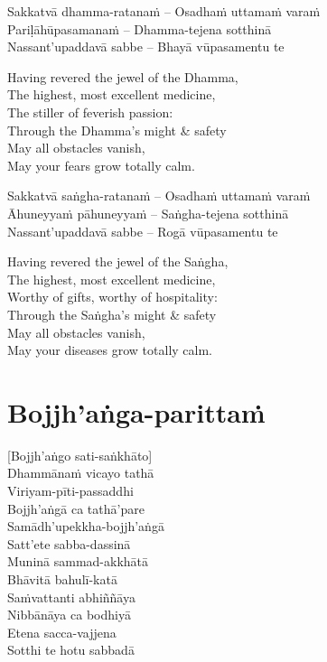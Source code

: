 Sakkatvā dhamma-ratanaṁ – Osadhaṁ uttamaṁ varaṁ\\
Pariḷāhūpasamanaṁ – Dhamma-tejena sotthinā\\
Nassant'upaddavā sabbe – Bhayā vūpasamentu te

\begin{english-verses}
  Having revered the jewel of the Dhamma,\\
  The highest, most excellent medicine,\\
  The stiller of feverish passion:\\
  Through the Dhamma's might \& safety\\
  May all obstacles vanish,\\
  May your fears grow totally calm.
\end{english-verses}

Sakkatvā saṅgha-ratanaṁ – Osadhaṁ uttamaṁ varaṁ\\
Āhuneyyaṁ pāhuneyyaṁ – Saṅgha-tejena sotthinā\\
Nassant'upaddavā sabbe – Rogā vūpasamentu te

\begin{english-verses}
  Having revered the jewel of the Saṅgha,\\
  The highest, most excellent medicine,\\
  Worthy of gifts, worthy of hospitality:\\
  Through the Saṅgha's might \& safety\\
  May all obstacles vanish,\\
  May your diseases grow totally calm.
\end{english-verses}

\suttaRef{[MJG]}

\section{Bojjh'aṅga-parittaṁ}
\label{bojjhana-parittam}
[Bojjh'aṅgo sati-saṅkhāto]\\
Dhammānaṁ vicayo tathā\\
Viriyam-pīti-passaddhi\\
Bojjh'aṅgā ca tathā'pare\\
Samādh'upekkha-bojjh'aṅgā\\
Satt'ete sabba-dassinā\\
Muninā sammad-akkhātā\\
Bhāvitā bahulī-katā\\
Saṁvattanti abhiññāya\\
Nibbānāya ca bodhiyā\\
Etena sacca-vajjena\\
Sotthi te hotu sabbadā

